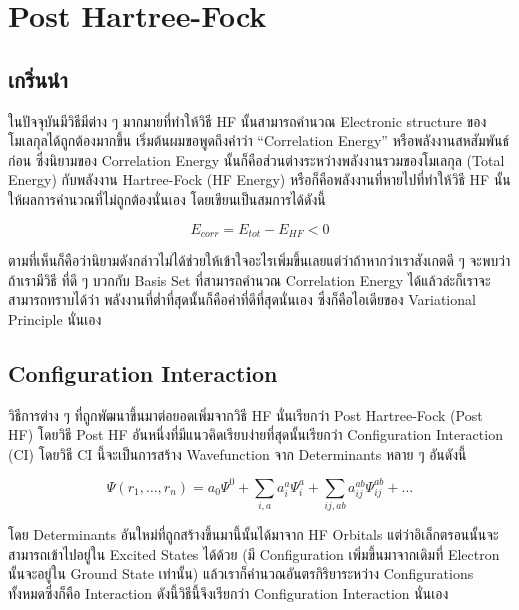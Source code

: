 
\chapter{Post Hartree-Fock}

\section{เกริ่นนำ}

ในปัจจุบันมีวิธีมีต่าง ๆ มากมายที่ทำให้วิธี HF นั้นสามารถคำนวณ Electronic structure ของโมเลกุลได้ถูกต้องมากขึ้น
เริ่มต้นผมขอพูดถึงคำว่า \enquote{Correlation Energy} หรือพลังงานสหสัมพันธ์ก่อน ซึ่งนิยามของ Correlation
Energy นั้นก็คือส่วนต่างระหว่างพลังงานรวมของโมเลกุล (Total Energy) กับพลังงาน Hartree-Fock (HF Energy)
หรือก็คือพลังงานที่หายไปที่ทำให้วิธี HF นั้นให้ผลการคำนวณที่ไม่ถูกต้องนั่นเอง โดยเขียนเป็นสมการได้ดังนี้

\begin{equation}
    E_{corr} = E_{tot} - E_{HF} < 0
\end{equation}

ตามที่เห็นก็คือว่านิยามดังกล่าวไม่ได้ช่วยให้เข้าใจอะไรเพิ่มขึ้นเลยแต่ว่าถ้าหากว่าเราสังเกตดี ๆ จะพบว่าถ้าเรามีวิธี%
ที่ดี ๆ บวกกับ Basis Set ที่สามารถคำนวณ Correlation Energy ได้แล้วล่ะก็เราจะสามารถทราบได้ว่า%
พลังงานที่ต่ำที่สุดนั้นก็คือค่าที่ดีที่สุดนั่นเอง ซึ่งก็คือไอเดียของ Variational Principle นั่นเอง

\section{Configuration Interaction}

วิธีการต่าง ๆ ที่ถูกพัฒนาขึ้นมาต่อยอดเพิ่มจากวิธี HF นั่นเรียกว่า Post Hartree-Fock (Post HF)
โดยวิธี Post HF อันหนึ่งที่มีแนวคิดเรียบง่ายที่สุดนั้นเรียกว่า Configuration Interaction (CI)
โดยวิธี CI นี้จะเป็นการสร้าง Wavefunction จาก Determinants หลาย ๆ อันดังนี้

\begin{equation}
    \Psi(r_{1}, \dots, r_{n})
    =
    a_{0} \Psi^{0}
    + \sum_{i,a} a^{a}_{i} \Psi^{a}_{i}
    + \sum_{ij,ab} a^{ab}_{ij} \Psi^{ab}_{ij}
    + \dots
\end{equation}

โดย Determinants อันใหม่ที่ถูกสร้างขึ้นมานี้นั้นได้มาจาก HF Orbitals แต่ว่าอิเล็กตรอนนั้นจะสามารถเข้าไปอยู่ใน
Excited States ได้ด้วย (มี Configuration เพิ่มขึ้นมาจากเดิมที่ Electron นั้นจะอยู่ใน Ground State
เท่านั้น) แล้วเราก็คำนวณอันตรกิริยาระหว่าง Configurations ทั้งหมดซึ่งก็คือ Interaction ดังนี้วิธีนี้จึงเรียกว่า
Configuration Interaction นั่นเอง

